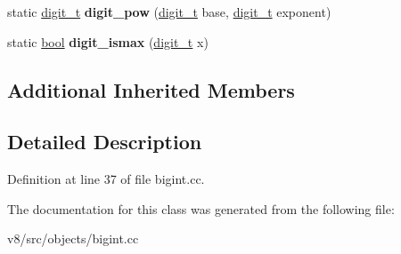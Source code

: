 \begin{DoxyCompactItemize}
\item 
\mbox{\label{classv8_1_1internal_1_1MutableBigInt_a8c00e700eaa43dd86c2da8c92844c450}} 
static \mbox{\hyperlink{classuintptr__t}{digit\+\_\+t}} {\bfseries digit\+\_\+pow} (\mbox{\hyperlink{classuintptr__t}{digit\+\_\+t}} base, \mbox{\hyperlink{classuintptr__t}{digit\+\_\+t}} exponent)
\item 
\mbox{\label{classv8_1_1internal_1_1MutableBigInt_a335191725c9446e335eb9107f57df8c7}} 
static \mbox{\hyperlink{classbool}{bool}} {\bfseries digit\+\_\+ismax} (\mbox{\hyperlink{classuintptr__t}{digit\+\_\+t}} x)
\end{DoxyCompactItemize}
\subsection*{Additional Inherited Members}


\subsection{Detailed Description}


Definition at line 37 of file bigint.\+cc.



The documentation for this class was generated from the following file\+:\begin{DoxyCompactItemize}
\item 
v8/src/objects/bigint.\+cc\end{DoxyCompactItemize}
